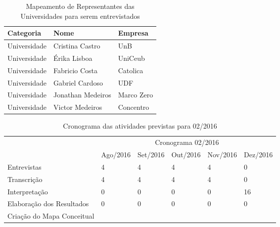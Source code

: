 \begin{table}[!htb]
	\centering
	\label{tabela:sugestao_de_universidades_para_entrevista}
	\begin{tabular}{ | p{3cm} | p{8cm} | p{4cm} | }
		\hline
		Categoria & Nome & Empresa \\ \hline
		Universidade & Cristina Castro & UnB \\ \hline
		Universidade & Érika Lisboa & UniCeub \\ \hline
		Universidade & Fabricio Costa & Catolica \\ \hline
		Universidade & Gabriel Cardoso & UDF \\ \hline
		Universidade & Jonathan Medeiros & Marco Zero \\ \hline		
		Universidade & Victor Medeiros & Concentro \\ \hline
	\end{tabular}
	\caption{Mapeamento de Representantes das Universidades para serem entrevistados}
\end{table}

\begin{table}[!htpb]
	\centering
	\begin{small} 
		\begin{tabular}{|p{5cm}|p{2cm}|p{2cm}|p{2cm}|p{2cm}|p{2cm}|} \hline
		 & \multicolumn{5}{c|}{Cronograma 02/2016}\\ \cline{2-6} 
		\raisebox{1.5ex}{Atividade} & Ago/2016 & Set/2016 & Out/2016 & Nov/2016 & Dez/2016 \\ \hline
		Entrevistas   & 4 & 4 & 4 & 4 & 0 \\ \hline
		Transcrição   & 4 & 4 & 4 & 4 & 0 \\ \hline
		Interpretação & 0 & 0 & 0 & 0 & 16 \\ \hline
		Elaboração dos Resultados    & 0 & 0 & 0 & 0 & 0 \\ \hline
		Criação do Mapa Conceitual &   &   &   &   &   \\ \hline
		\end{tabular} 
	\end{small}
	\caption{Cronograma das atividades previstas para 02/2016}
	\label{t_cronograma}
\end{table} 

